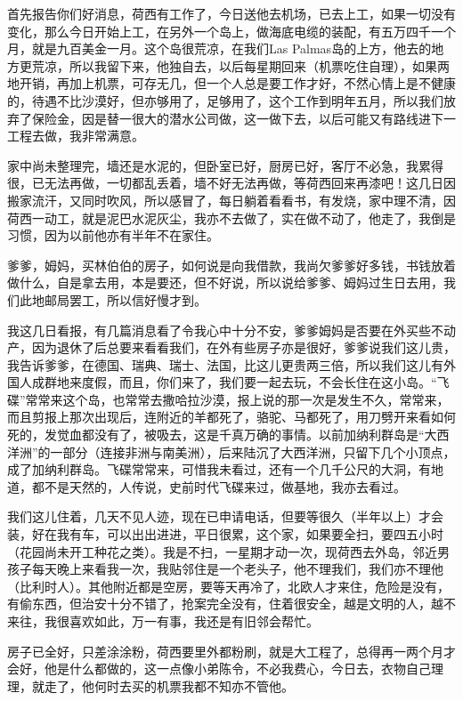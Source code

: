 \par {}
\par 首先报告你们好消息，荷西有工作了，今日送他去机场，已去上工，如果一切没有变化，那么今日开始上工，在另外一个岛上，做海底电缆的装配，有五万四千一个月，就是九百美金一月。这个岛很荒凉，在我们Las Palmas岛的上方，他去的地方更荒凉，所以我留下来，他独自去，以后每星期回来（机票吃住自理），如果两地开销，再加上机票，可存无几，但一个人总是要工作才好，不然心情上是不健康的，待遇不比沙漠好，但亦够用了，足够用了，这个工作到明年五月，所以我们放弃了保险金，因是替一很大的潜水公司做，这一做下去，以后可能又有路线进下一工程去做，我非常满意。
\par 家中尚未整理完，墙还是水泥的，但卧室已好，厨房已好，客厅不必急，我累得很，已无法再做，一切都乱丢着，墙不好无法再做，等荷西回来再漆吧！这几日因搬家流汗，又同时吹风，所以感冒了，每日躺着看看书，有发烧，家中理不清，因荷西一动工，就是泥巴水泥灰尘，我亦不去做了，实在做不动了，他走了，我倒是习惯，因为以前他亦有半年不在家住。
\par 爹爹，姆妈，买林伯伯的房子，如何说是向我借款，我尚欠爹爹好多钱，书钱放着做什么，自是拿去用，本是要还，但不好说，所以说给爹爹、姆妈过生日去用，我们此地邮局罢工，所以信好慢才到。
\par 我这几日看报，有几篇消息看了令我心中十分不安，爹爹姆妈是否要在外买些不动产，因为退休了后总要来看看我们，在外有些房子亦是很好，爹爹说我们这儿贵，我告诉爹爹，在德国、瑞典、瑞士、法国，比这儿更贵两三倍，所以我们这儿有外国人成群地来度假，而且，你们来了，我们要一起去玩，不会长住在这小岛。“飞碟”常常来这个岛，也常常去撒哈拉沙漠，报上说的那一次是发生不久，常常来，而且剪报上那次出现后，连附近的羊都死了，骆驼、马都死了，用刀劈开来看如何死的，发觉血都没有了，被吸去，这是千真万确的事情。以前加纳利群岛是“大西洋洲”的一部分（连接非洲与南美洲），后来陆沉了大西洋洲，只留下几个小顶点，成了加纳利群岛。飞碟常常来，可惜我未看过，还有一个几千公尺的大洞，有地道，都不是天然的，人传说，史前时代飞碟来过，做基地，我亦去看过。
\par 我们这儿住着，几天不见人迹，现在已申请电话，但要等很久（半年以上）才会装，好在我有车，可以出出进进，平日很累，这个家，如果要全扫，要四五小时（花园尚未开工种花之类）。我是不扫，一星期才动一次，现荷西去外岛，邻近男孩子每天晚上来看我一次，我贴邻住是一个老头子，他不理我们，我们亦不理他（比利时人）。其他附近都是空房，要等天再冷了，北欧人才来住，危险是没有，有偷东西，但治安十分不错了，抢案完全没有，住着很安全，越是文明的人，越不来往，我很喜欢如此，万一有事，我还是有旧邻会帮忙。
\par 房子已全好，只差涂涂粉，荷西要里外都粉刷，就是大工程了，总得再一两个月才会好，他是什么都做的，这一点像小弟陈令，不必我费心，今日去，衣物自己理理，就走了，他何时去买的机票我都不知亦不管他。
